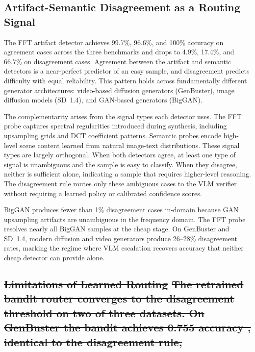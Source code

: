 \documentclass{ieeeaccess}
\providecommand{\DIFaddtex}[1]{{\protect\color{blue}\uwave{#1}}} %
\providecommand{\DIFdeltex}[1]{{\protect\color{red}\sout{#1}}}                      %
\providecommand{\DIFaddbegin}{} %
\providecommand{\DIFdelbegin}{} %
\providecommand{\DIFdelend}{} %
\providecommand{\DIFadd}[1]{\texorpdfstring{\DIFaddtex{#1}}{#1}} %
\providecommand{\DIFdel}[1]{\texorpdfstring{\DIFdeltex{#1}}{}} %
\newcommand{\DIFscaledelfig}{0.5}
\newlength{\DIFdelgraphicswidth} %
\newlength{\DIFdelgraphicsheight} %
\newcommand{\DIFaddincludegraphics}[2][]{{\color{blue}\fbox{\DIFOincludegraphics[#1]{#2}}}} %
\newcommand{\DIFdelincludegraphics}[2][]{%
\sbox{\DIFdelgraphicsbox}{\DIFOincludegraphics[#1]{#2}}%
\settoboxwidth{\DIFdelgraphicswidth}{\DIFdelgraphicsbox} %
\settoboxtotalheight{\DIFdelgraphicsheight}{\DIFdelgraphicsbox} %
\scalebox{\DIFscaledelfig}{%
\parbox[b]{\DIFdelgraphicswidth}{\usebox{\DIFdelgraphicsbox}\\[-\baselineskip] \rule{\DIFdelgraphicswidth}{0em}}\llap{\resizebox{\DIFdelgraphicswidth}{\DIFdelgraphicsheight}{%
\setlength{\unitlength}{\DIFdelgraphicswidth}%
\begin{picture}(1,1)%
\thicklines\linethickness{2pt} %
{\color[rgb]{1,0,0}\put(0,0){\framebox(1,1){}}}%
{\color[rgb]{1,0,0}\put(0,0){\line( 1,1){1}}}%
{\color[rgb]{1,0,0}\put(0,1){\line(1,-1){1}}}%
\end{picture}%
}\hspace*{3pt}}} %
} %
\DeclareRobustCommand{\DIFaddbegin}{\DIFOaddbegin \let\includegraphics\DIFaddincludegraphics} %
\DeclareRobustCommand{\DIFdelbegin}{\DIFOdelbegin \let\includegraphics\DIFdelincludegraphics} %
\DeclareRobustCommand{\DIFdelend}{\DIFOaddend \let\includegraphics\DIFOincludegraphics} %
\begin{document}
\subsection{Artifact-Semantic Disagreement as a Routing Signal}

The FFT artifact detector achieves 99.7\%, 96.6\%, and 100\% accuracy on agreement
cases across the three benchmarks and drops to 4.9\%, 17.4\%, and 66.7\% on
disagreement cases. Agreement between the artifact and semantic detectors is a
near-perfect predictor of an easy sample, and disagreement predicts difficulty with
equal reliability. This pattern holds across fundamentally different generator
architectures: video-based diffusion generators (GenBuster), image diffusion models
(SD~1.4), and GAN-based generators (BigGAN).

The complementarity arises from the signal types each detector uses. The FFT probe
captures spectral regularities introduced during synthesis, including upsampling grids
and DCT coefficient patterns. Semantic probes encode high-level scene content learned
from natural image-text distributions. These signal types are largely orthogonal.
When both detectors agree, at least one type of signal is unambiguous and the sample
is easy to classify. When they disagree, neither is sufficient alone, indicating a
sample that requires higher-level reasoning. The disagreement rule routes only these
ambiguous cases to the VLM verifier without requiring a learned policy or calibrated
confidence scores.

BigGAN produces fewer than 1\% disagreement cases in-domain because GAN upsampling
artifacts are unambiguous in the frequency domain. The FFT probe resolves nearly all
BigGAN samples at the cheap stage. On GenBuster and SD~1.4, modern diffusion and
video generators produce 26--28\% disagreement rates, marking the regime where VLM
escalation recovers accuracy that neither cheap detector can provide alone.

\subsection{\DIFdelbegin \DIFdel{Limitations of Learned Routing}%
\DIFdel{The retrained bandit router converges to the disagreement threshold on two of three
datasets. On GenBuster the bandit achieves 0.755 accuracy , identical to the
disagreement rule, }\DIFdelend \DIFaddbegin \DIFadd{Three Regimes in Practice}}
\label{sec:three_regimes}
\end{document}
